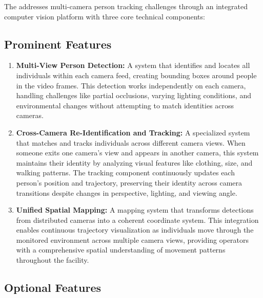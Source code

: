 The \usevar{\srsTitle} addresses multi-camera person tracking challenges through an integrated computer vision platform with three core technical components:

\subsection{Prominent Features}
\label{subsection:main-features}

\begin{enumerate}[leftmargin=80pt]
    \item \textbf{Multi-View Person Detection:} A system that identifies and locates all individuals within each camera feed, creating bounding boxes around people in the video frames. This detection works independently on each camera, handling challenges like partial occlusions, varying lighting conditions, and environmental changes without attempting to match identities across cameras.

    \item \textbf{Cross-Camera Re-Identification and Tracking:} A specialized system that matches and tracks individuals across different camera views. When someone exits one camera's view and appears in another camera, this system maintains their identity by analyzing visual features like clothing, size, and walking patterns. The tracking component continuously updates each person's position and trajectory, preserving their identity across camera transitions despite changes in perspective, lighting, and viewing angle.

    \item \textbf{Unified Spatial Mapping:} A mapping system that transforms detections from distributed cameras into a coherent coordinate system. This integration enables continuous trajectory visualization as individuals move through the monitored environment across multiple camera views, providing operators with a comprehensive spatial understanding of movement patterns throughout the facility.
\end{enumerate}

\subsection{Optional Features}
\label{subsection:optional-features}

